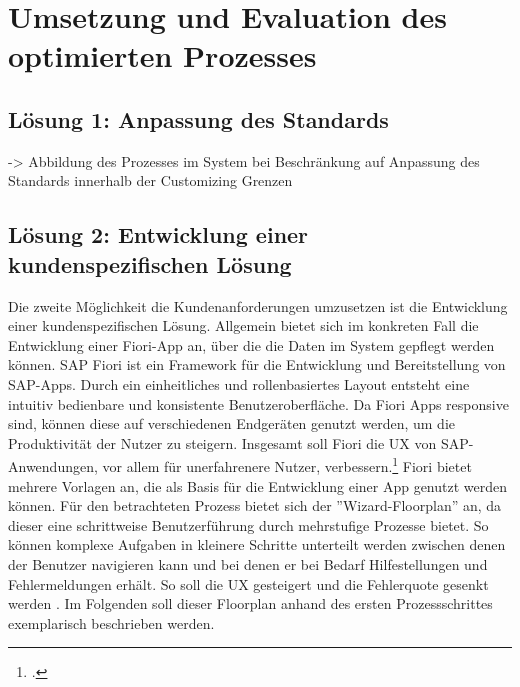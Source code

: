 \chapter{Umsetzung und Evaluation des optimierten Prozesses}



\section{Lösung 1: Anpassung des Standards}

-> Abbildung des Prozesses im System bei Beschränkung auf Anpassung des Standards innerhalb der Customizing Grenzen

\section{Lösung 2: Entwicklung einer kundenspezifischen Lösung}

Die zweite Möglichkeit die Kundenanforderungen umzusetzen ist die Entwicklung einer kundenspezifischen Lösung. Allgemein bietet sich im konkreten Fall die Entwicklung einer Fiori-App an, über die die Daten im System gepflegt werden können. SAP Fiori ist ein Framework für die Entwicklung und Bereitstellung von SAP-Apps. Durch ein einheitliches und rollenbasiertes Layout entsteht eine intuitiv bedienbare und konsistente Benutzeroberfläche. Da Fiori Apps responsive sind, können diese auf verschiedenen Endgeräten genutzt werden, um die Produktivität der Nutzer zu steigern. Insgesamt soll Fiori die UX von SAP-Anwendungen, vor allem für unerfahrenere Nutzer, verbessern.\footcite[Vgl.][]{praxis_sap_fiori_allgemein_2024} Fiori bietet mehrere Vorlagen an, die als Basis für die Entwicklung einer App genutzt werden können. Für den betrachteten Prozess bietet sich der ''Wizard-Floorplan'' an, da dieser eine schrittweise Benutzerführung durch mehrstufige Prozesse bietet. So können komplexe Aufgaben in kleinere Schritte unterteilt werden zwischen denen der Benutzer navigieren kann und bei denen er bei Bedarf Hilfestellungen und Fehlermeldungen erhält. So soll die UX gesteigert und die Fehlerquote gesenkt werden \parencite[Vgl.][]{praxis_sap_wizard_floorplan_2024}. Im Folgenden soll dieser Floorplan anhand des ersten Prozessschrittes exemplarisch beschrieben werden.

